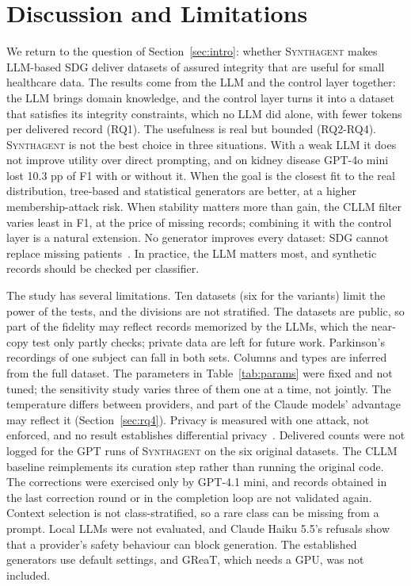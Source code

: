 \documentclass[conference]{IEEEtran}
\newcommand{\system}{\textsc{Synthagent}\xspace}
\begin{document}
\section{Discussion and Limitations}
\label{sec:discussion}
We return to the question of Section~\ref{sec:intro}: whether \system makes LLM-based SDG deliver datasets of assured integrity that are useful for small healthcare data. The results come from the LLM and the control layer together: the LLM brings domain knowledge, and the control layer turns it into a dataset that satisfies its integrity constraints, which no LLM did alone, with fewer tokens per delivered record (RQ1). The usefulness is real but bounded (RQ2-RQ4). \system is not the best choice in three situations. With a weak LLM it does not improve utility over direct prompting, and on kidney disease GPT-4o mini lost 10.3 pp of F1 with or without it. When the goal is the closest fit to the real distribution, tree-based and statistical generators are better, at a higher membership-attack risk. When stability matters more than gain, the CLLM filter varies least in F1, at the price of missing records; combining it with the control layer is a natural extension. No generator improves every dataset: SDG cannot replace missing patients~\cite[Sec.~2.8]{cover2006elements}. In practice, the LLM matters most, and synthetic records should be checked per classifier.

The study has several limitations. Ten datasets (six for the variants) limit the power of the tests, and the divisions are not stratified. The datasets are public, so part of the fidelity may reflect records memorized by the LLMs, which the near-copy test only partly checks; private data are left for future work. Parkinson's recordings of one subject can fall in both sets. Columns and types are inferred from the full dataset. The parameters in Table~\ref{tab:params} were fixed and not tuned; the sensitivity study varies three of them one at a time, not jointly. The temperature differs between providers, and part of the Claude models' advantage may reflect it (Section~\ref{sec:rq4}). Privacy is measured with one attack, not enforced, and no result establishes differential privacy~\cite{dwork2014dp}. Delivered counts were not logged for the GPT runs of \system on the six original datasets. The CLLM baseline reimplements its curation step rather than running the original code. The corrections were exercised only by GPT-4.1 mini, and records obtained in the last correction round or in the completion loop are not validated again. Context selection is not class-stratified, so a rare class can be missing from a prompt. Local LLMs were not evaluated, and Claude Haiku 5.5's refusals show that a provider's safety behaviour can block generation. The established generators use default settings, and GReaT, which needs a GPU, was not included.
\end{document}
